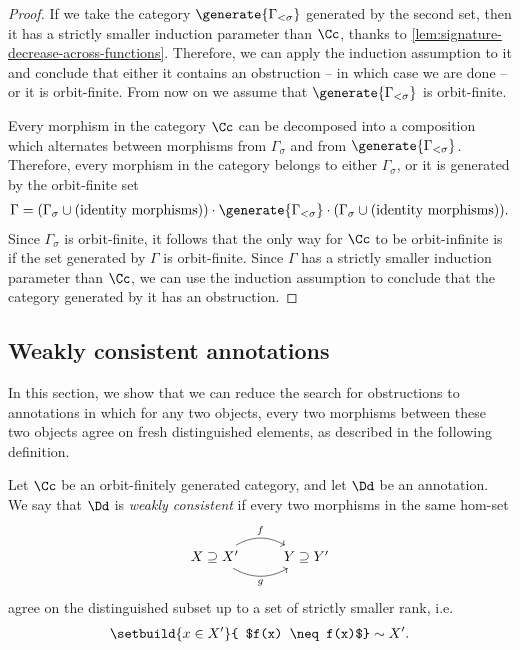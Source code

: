 \begin{proof}
    If we take the category $\generate{\Gamma_{<\sigma}}$ generated by the second set, then it has a strictly smaller induction parameter than $\Cc$, thanks to \cref{lem:signature-decrease-across-functions}. Therefore, we can apply the induction assumption to it and conclude that either it contains an obstruction -- in which case we are done -- or it is orbit-finite. From now on we assume that $\generate{\Gamma_{<\sigma}}$ is orbit-finite. 

    Every morphism in the category $\Cc$ can be decomposed into a composition which alternates between morphisms from $\Gamma_{\sigma}$ and from $\generate{\Gamma_{<\sigma}}$. Therefore, every morphism in the category belongs to either  $\Gamma_{\sigma}$, or it is generated by the orbit-finite set
    \begin{align*}
            \Gamma = (\Gamma_{\sigma} \cup \text{(identity morphisms)}) \cdot \generate{\Gamma_{<\sigma}} \cdot (\Gamma_{\sigma} \cup \text{(identity morphisms)}).
    \end{align*} 
    Since $\Gamma_{\sigma}$ is orbit-finite, it follows that the only way for $\Cc$ to be orbit-infinite is if the set generated by $\Gamma$ is orbit-finite. Since $\Gamma$ has a strictly smaller induction parameter than $\Cc$, we can use the induction assumption to conclude that the category generated by it has an obstruction. 
\end{proof}


\subsection{Weakly consistent annotations}
\label{sec:weakly-consistent-annotations}

In this section, we show that we can reduce the search for obstructions to annotations in which for any two objects, every two morphisms between these two objects agree on fresh distinguished elements, as described in the following definition.


\begin{definition}
    \label{def:weak-consistency}
    Let $\Cc$ be an orbit-finitely generated category, and let $\Dd$ be an annotation. We say that $\Dd$ is \emph{weakly consistent} if every two morphisms in the same hom-set 
    \[
    \begin{tikzcd}
    X \supseteq X' \ar[r, bend left, "f"]
    \ar[r, bend right, "g"'] & Y \supseteq Y'
    \end{tikzcd}
    \]
    agree on the distinguished subset up to a set of strictly smaller rank, i.e.~
    \begin{align*}
     \setbuild{ x \in X'}{ $f(x) \neq f(x)$}  \sim X'.
    \end{align*}
\end{definition}

